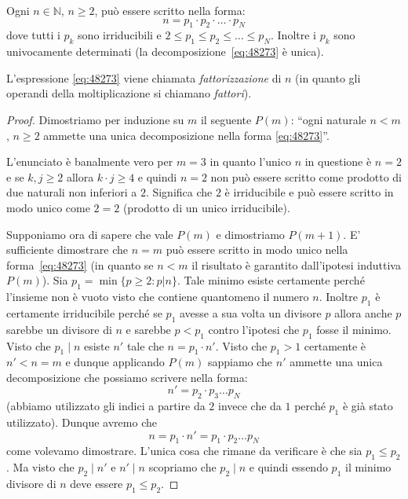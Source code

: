 \documentclass[italian,a4paper,hidelinks,headinclude]{scrartcl}
\newcommand{\NN}{{\mathbb N}}
\newcommand{\myemph}[1]{\emph{#1}\marginpar{#1}}
\begin{document}
\begin{theorem}
  Ogni $n\in \NN$, $n\ge 2$, può essere scritto nella forma:
  \begin{equation}\label{eq:48273}
    n = p_1 \cdot p_2 \cdot \ldots \cdot p_N
  \end{equation}
  dove tutti i $p_k$ sono irriducibili e
  $2 \le p_1 \le p_2 \le \dots \le p_N$.
  Inoltre i $p_k$ sono univocamente determinati (la
  decomposizione~\eqref{eq:48273} è unica).

  L'espressione \eqref{eq:48273} viene chiamata \myemph{fattorizzazione}
  di $n$ (in quanto gli operandi della moltiplicazione
  si chiamano \emph{fattori}).
\end{theorem}
%
\begin{proof}
  Dimostriamo per induzione su $m$ il seguente
  $P(m)$: ``ogni naturale $n<m$, $n\ge 2$
    ammette una unica decomposizione
    nella forma \eqref{eq:48273}''.

  L'enunciato è banalmente vero per $m=3$ in quanto l'unico $n$ in questione
  è $n=2$ e se $k,j\ge 2$ allora
  $k\cdot j\ge 4$ e quindi $n=2$ non può essere scritto come prodotto di due
  naturali non inferiori a $2$.
  Significa che $2$ è irriducibile e può essere scritto in modo unico come $2=2$
  (prodotto di un unico irriducibile).

  Supponiamo ora di sapere che vale $P(m)$ e dimostriamo $P(m+1)$.
  E' sufficiente dimostrare che $n=m$ può essere scritto in modo unico
  nella forma~\eqref{eq:48273} (in quanto se $n<m$ il risultato è garantito
  dall'ipotesi induttiva $P(m)$).
  Sia $p_1 = \min\{p\ge 2\colon p|n\}$.
  Tale minimo esiste certamente perché l'insieme non è vuoto visto che contiene
  quantomeno il numero $n$. Inoltre $p_1$ è certamente irriducibile perché se
  $p_1$ avesse a sua volta un divisore $p$ allora anche $p$ sarebbe un divisore
  di $n$ e sarebbe $p<p_1$ contro l'ipotesi che $p_1$ fosse il minimo.
  Visto che $p_1\mid n$ esiste $n'$ tale che $n=p_1\cdot n'$.
  Visto che $p_1>1$ certamente è $n'<n=m$ e dunque applicando $P(m)$ sappiamo
  che $n'$ ammette una unica decomposizione che possiamo scrivere nella forma:
  \[
    n' = p_2 \cdot p_3 \dots p_N
  \]
  (abbiamo utilizzato gli indici a partire da $2$ invece che da $1$ perché $p_1$
  è già stato utilizzato). Dunque avremo che
  \[
    n = p_1 \cdot n' = p_1 \cdot p_2 \dots p_N
  \]
  come volevamo dimostrare. L'unica cosa che rimane da verificare è che
  sia $p_1\le p_2$. Ma visto che $p_2 \mid n'$ e $n'\mid n$ scopriamo che
  $p_2\mid n$ e quindi essendo $p_1$ il minimo divisore di $n$ deve essere
  $p_1\le p_2$.
\end{proof}
\end{document}
